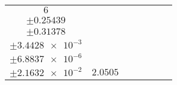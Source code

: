 \documentclass[8pt]{article}
\begin{document}
\begin{longtable}[l]{c c c c c c c}
$\num{6}$ & \begin{tabular}[c]{@{}c@{}}$\num{46.45}$ \\ $\pm\num{0.25439}$\end{tabular} & \begin{tabular}[c]{@{}c@{}}$\num{0.18452}$ \\ $\pm\num{0.31378}$\end{tabular} & \begin{tabular}[c]{@{}c@{}}$\num{3.3227e+3}$ \\ $\pm\num{3.4428e-3}$\end{tabular} & \begin{tabular}[c]{@{}c@{}}$\num{6.6436}$ \\ $\pm\num{6.8837e-6}$\end{tabular} & \begin{tabular}[c]{@{}c@{}}$\num{5.7537}$ \\ $\pm\num{2.1632e-2}$\end{tabular} & $\num{2.0505}$\\
\bottomrule
\end{longtable}
\end{document}
